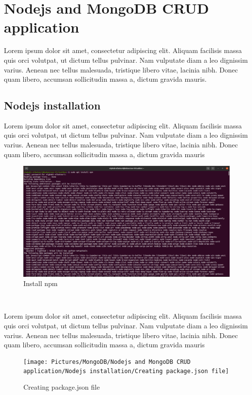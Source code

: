 \chapter{Nodejs and MongoDB CRUD  application}
\par Lorem ipsum dolor sit amet, consectetur adipiscing elit. Aliquam facilisis massa quis orci volutpat, ut dictum tellus pulvinar. Nam vulputate diam a leo dignissim varius. Aenean nec tellus malesuada, tristique libero vitae, lacinia nibh. Donec quam libero, accumsan sollicitudin massa a, dictum gravida mauris.
\begin{spacing}{1.2}
\section{Nodejs installation }
\par Lorem ipsum dolor sit amet, consectetur adipiscing elit. Aliquam facilisis massa quis orci volutpat, ut dictum tellus pulvinar. Nam vulputate diam a leo dignissim varius. Aenean nec tellus malesuada, tristique libero vitae, lacinia nibh. Donec quam libero, accumsan sollicitudin massa a, dictum gravida mauris
\\
\begin{figure}[!htb] 
\begin{center} 
\includegraphics[width=1\linewidth]{Pictures/MongoDB/Nodejs and MongoDB CRUD application/Nodejs installation/Install npm} 
\end{center} 
\caption{Install npm} 
\end{figure}  \FloatBarrier
\\

\par Lorem ipsum dolor sit amet, consectetur adipiscing elit. Aliquam facilisis massa quis orci volutpat, ut dictum tellus pulvinar. Nam vulputate diam a leo dignissim varius. Aenean nec tellus malesuada, tristique libero vitae, lacinia nibh. Donec quam libero, accumsan sollicitudin massa a, dictum gravida mauris
\\
\begin{figure}[!htb] 
\begin{center} 
\texttt{[image: Pictures/MongoDB/Nodejs and MongoDB CRUD  application/Nodejs installation/Creating package.json file]} 
\end{center} 
\caption{Creating package.json file} 
\end{figure}  \FloatBarrier
\\


\end{spacing}
